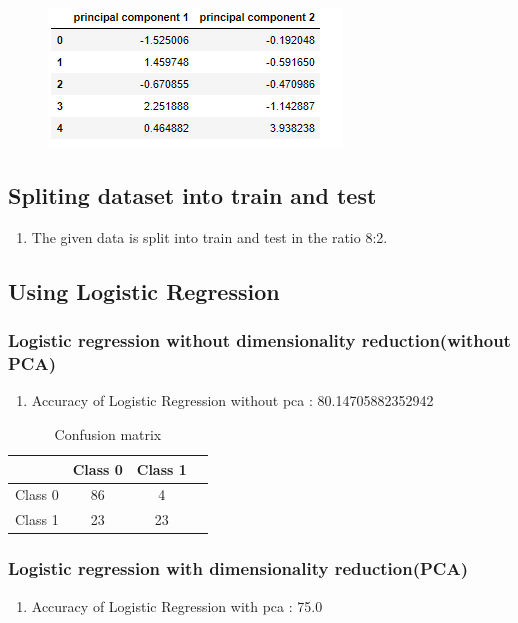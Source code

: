 \documentclass[12pt]{article}
\begin{document}
\begin{figure}[h]
\centering
\includegraphics[scale=1]{PCA_table.PNG} 
\label{etiqueta}
\end{figure}


\subsection{Spliting dataset into train and test}

\begin{enumerate}
\item The given data is split into train and test in the ratio 8:2. 

\end{enumerate}

\subsection{Using Logistic Regression}

\subsubsection{Logistic regression without dimensionality reduction(without PCA)}
\begin{enumerate}
\item Accuracy of Logistic Regression without pca :  80.14705882352942
 

\end{enumerate}

\begin{table}[h]
\begin{center}
\begin{tabular}{|c|c|c|c|}
\hline
 \textbf{} & {Class 0} & {Class 1}\\\hline
Class 0  & 86 & 4\\\hline
Class 1  & 23 & 23\\\hline
\end{tabular}
\end{center}
\caption{Confusion matrix}
\end{table}

\subsubsection{Logistic regression with dimensionality reduction(PCA)}
\begin{enumerate}
\item Accuracy of Logistic Regression with pca :  75.0

\end{enumerate}
\end{document}
